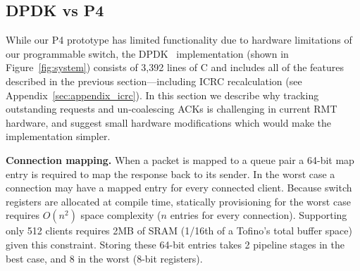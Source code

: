 

\subsection{DPDK vs P4}

While our P4 prototype has limited functionality due to hardware
limitations of our programmable switch, the DPDK
\sword\ implementation (shown in Figure~\ref{fig:system}) consists of
3,392 lines of C and includes all of the features described in the
previous section---including ICRC recalculation (see
Appendix~\ref{sec:appendix_icrc}).  In this section we describe why
tracking outstanding requests and un-coalescing ACKs is challenging in
current RMT hardware, and suggest small hardware modifications which
would make the implementation simpler.


\textbf{Connection mapping.} When a packet is mapped to a queue pair a
64-bit map entry is required to map the response back to its
sender. In the worst case a connection may have a mapped entry for
every connected client. Because switch registers are allocated at
compile time, statically provisioning for the worst case requires
$O(n^2)$ space complexity ($n$ entries for every connection).
Supporting only 512 clients requires 2MB of SRAM (1/16th of a Tofino's
total buffer space) given this constraint. Storing these 64-bit
entries takes 2 pipeline stages in the best case, and 8 in the worst
(8-bit registers).

